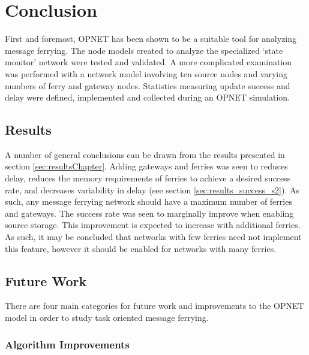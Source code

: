 \chapter{Conclusion} 

First and foremost, OPNET has been shown to be a suitable tool for analyzing message ferrying.
The node models created to analyze the specialized \lq{}state monitor\rq{} network were tested and validated.
A more complicated examination was performed with a network model involving ten source nodes and varying numbers of ferry and gateway nodes.
Statistics measuring update success and delay were defined, implemented and collected during an OPNET simulation.


\section{Results}

A number of general conclusions can be drawn from the results presented in section \ref{sec:resultsChapter}.
Adding gateways and ferries was seen to reduces delay, reduces the memory requirements of ferries to achieve a desired success rate, and decreases variability in delay (see section \ref{sec:results_success_s2}).
As such, any message ferrying network should have a maximum number of ferries and gateways.
The success rate was seen to marginally improve when enabling source storage.
This improvement is expected to increase with additional ferries.
As such, it may be concluded that networks with few ferries need not implement this feature, however it should be enabled for networks with many ferries.



\section{Future Work}

There are four main categories for future work and improvements to the OPNET model in order to study task oriented message ferrying.

\subsection{Algorithm Improvements}

